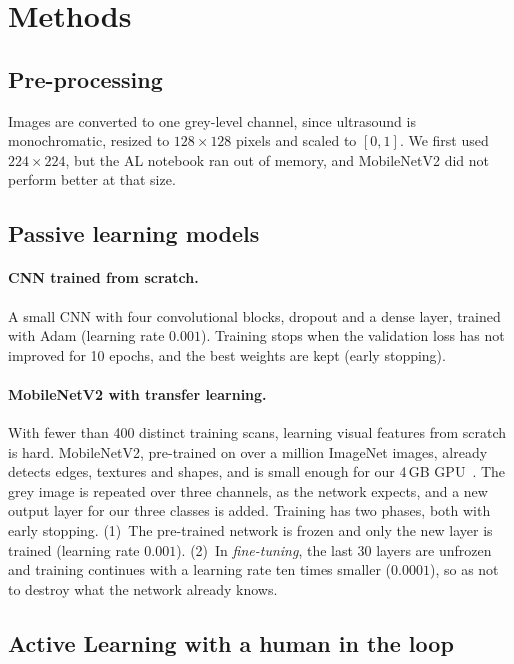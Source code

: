 \documentclass{article}
\begin{document}
\section{Methods}
\label{sec:methods}

\subsection{Pre-processing}
Images are converted to one grey-level channel, since ultrasound is monochromatic, resized
to $128\times128$ pixels and scaled to $[0,1]$. We first used $224\times224$, but the AL
notebook ran out of memory, and MobileNetV2 did not perform better at that size.

\subsection{Passive learning models}
\paragraph{CNN trained from scratch.}
A small CNN with four convolutional blocks, dropout and a dense layer, trained with Adam
(learning rate $0.001$). Training stops when the validation loss has not improved for 10
epochs, and the best weights are kept (early stopping).

\paragraph{MobileNetV2 with transfer learning.}
With fewer than 400 distinct training scans, learning visual features from scratch is hard.
MobileNetV2, pre-trained on over a million ImageNet images, already detects edges, textures
and shapes, and is small enough for our 4\,GB
GPU~\cite{sandler2018mobilenetv2}. The grey image is repeated over three
channels, as the network expects, and a new output layer for our three classes is added.
Training has two phases, both with early stopping. (1)~The pre-trained network is frozen
and only the new layer is trained (learning rate $0.001$). (2)~In \emph{fine-tuning}, the
last 30 layers are unfrozen and training continues with a learning rate ten times smaller
($0.0001$), so as not to destroy what the network already knows.

\subsection{Active Learning with a human in the loop}
\label{sec:al}
\end{document}
